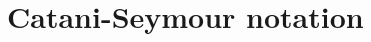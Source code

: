 \documentclass[main.tex]{subfiles}
\begin{document}
\chapter{Catani-Seymour notation}
\label{appendix:catani_seymour}
\end{document}

